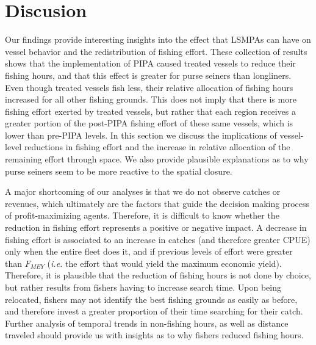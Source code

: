 \documentclass[12pt,]{article}
\begin{document}
\clearpage

\hypertarget{discusion}{%
\section{Discusion}\label{discusion}}

Our findings provide interesting insights into the effect that LSMPAs
can have on vessel behavior and the redistribution of fishing effort.
These collection of results shows that the implementation of PIPA caused
treated vessels to reduce their fishing hours, and that this effect is
greater for purse seiners than longliners. Even though treated vessels
fish less, their relative allocation of fishing hours increased for all
other fishing grounds. This does not imply that there is more fishing
effort exerted by treated vessels, but rather that each region receives
a greater portion of the post-PIPA fishing effort of these same vessels,
which is lower than pre-PIPA levels. In this section we discuss the
implications of vessel-level reductions in fishing effort and the
increase in relative allocation of the remaining effort through space.
We also provide plausible explanations as to why purse seiners seem to
be more reactive to the spatial closure.

A major shortcoming of our analyses is that we do not observe catches or
revenues, which ultimately are the factors that guide the decision
making process of profit-maximizing agents. Therefore, it is difficult
to know whether the reduction in fishing effort represents a positive or
negative impact. A decrease in fishing effort is associated to an
increase in catches (and therefore greater CPUE) only when the entire
fleet does it, and if previous levels of effort were greater than
\(F_{MEY}\) (\emph{i.e.} the effort that would yield the maximum
economic yield). Therefore, it is plausible that the reduction of
fishing hours is not done by choice, but rather results from fishers
having to increase search time. Upon being relocated, fishers may not
identify the best fishing grounds as easily as before, and therefore
invest a greater proportion of their time searching for their catch.
Further analysis of temporal trends in non-fishing hours, as well as
distance traveled should provide us with insights as to why fishers
reduced fishing hours.
\end{document}
